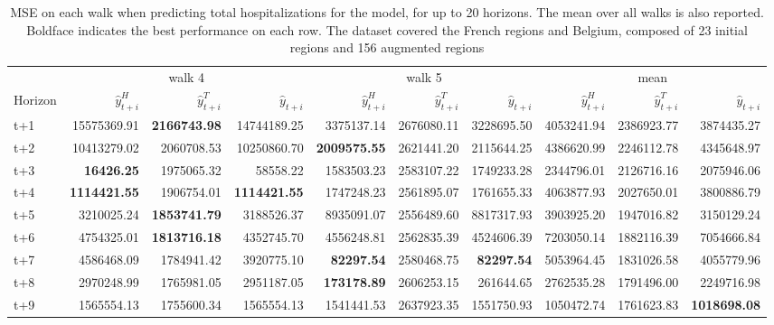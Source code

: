 \begin{table}[H]
\centering
\caption{MSE on each walk when predicting total hospitalizations for the model, for up to 20 horizons. The mean over all walks is also reported. Boldface indicates the best performance on each row. The dataset covered the French regions and Belgium, composed of 23 initial regions and 156 augmented regions }
\label{tab:MSE_walk_assemble}
\begin{tabular}{lrrrrrrrrr}
\toprule
 & \multicolumn{3}{c}{walk 4} & \multicolumn{3}{c}{walk 5} & \multicolumn{3}{c}{mean} 
\\

\cmidrule(lr){2-4} \cmidrule(lr){5-7} \cmidrule(lr){8-10} 
Horizon & $\hat{y}_{t+i}^H$ & $\hat{y}_{t+i}^T$ & $\hat{y}_{t+i}$ & $\hat{y}_{t+i}^H$ & $\hat{y}_{t+i}^T$ & $\hat{y}_{t+i}$ & $\hat{y}_{t+i}^H$ & $\hat{y}_{t+i}^T$ & $\hat{y}_{t+i}$ \\
\midrule
t+1  & 15575369.91  & \textbf{2166743.98}  & 14744189.25  & 3375137.14  & 2676080.11  & 3228695.50  & 4053241.94  & 2386923.77  & 3874435.27  \\
t+2  & 10413279.02  & 2060708.53  & 10250860.70  & \textbf{2009575.55}  & 2621441.20  & 2115644.25  & 4386620.99  & 2246112.78  & 4345648.97  \\
t+3  & \textbf{16426.25}  & 1975065.32  & 58558.22  & 1583503.23  & 2583107.22  & 1749233.28  & 2344796.01  & 2126716.16  & 2075946.06  \\
t+4  & \textbf{1114421.55}  & 1906754.01  & \textbf{1114421.55}  & 1747248.23  & 2561895.07  & 1761655.33  & 4063877.93  & 2027650.01  & 3800886.79  \\
t+5  & 3210025.24  & \textbf{1853741.79}  & 3188526.37  & 8935091.07  & 2556489.60  & 8817317.93  & 3903925.20  & 1947016.82  & 3150129.24  \\
t+6  & 4754325.01  & \textbf{1813716.18}  & 4352745.70  & 4556248.81  & 2562835.39  & 4524606.39  & 7203050.14  & 1882116.39  & 7054666.84  \\
t+7  & 4586468.09  & 1784941.42  & 3920775.10  & \textbf{82297.54}  & 2580468.75  & \textbf{82297.54}  & 5053964.45  & 1831026.58  & 4055779.96  \\
t+8  & 2970248.99  & 1765981.05  & 2951187.05  & \textbf{173178.89}  & 2606253.15  & 261644.65  & 2762535.28  & 1791496.00  & 2249716.98  \\
t+9  & 1565554.13  & 1755600.34  & 1565554.13  & 1541441.53  & 2637923.35  & 1551750.93  & 1050472.74  & 1761623.83  & \textbf{1018698.08}  \\

\end{tabular}
\end{table}
